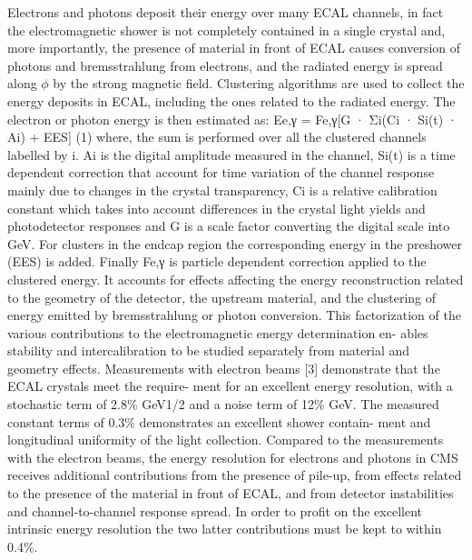 \documentclass[journal]{IEEEtran}
\begin{document}
Electrons and photons deposit their energy over many ECAL channels, in fact the electromagnetic shower is not completely contained in a single crystal and, more importantly, the presence of material in front of ECAL causes conversion of photons and bremsstrahlung from electrons, and the radiated energy is spread along $\phi$ by the strong magnetic field. Clustering algorithms are used to collect the energy deposits in ECAL, including the ones related to the radiated energy.
The electron or photon energy is then estimated as:
Ee,γ = Fe,γ[G · Σi(Ci · Si(t) · Ai) + EES] (1)
where, the sum is performed over all the clustered channels labelled by i. Ai is the digital amplitude measured in the channel, Si(t) is a time dependent correction that account for time variation of the channel response mainly due to changes in the crystal transparency, Ci is a relative calibration constant which takes into account differences in the crystal light yields and photodetector responses and G is a scale factor converting the digital scale into GeV. For clusters in the endcap region the corresponding energy in the preshower (EES) is added. Finally Fe,γ is particle dependent correction applied to the clustered energy. It accounts for effects affecting the energy reconstruction related to the geometry of the detector, the upstream material, and the clustering of energy emitted by bremsstrahlung or photon conversion.
This factorization of the various contributions to the electromagnetic energy determination en- ables stability and intercalibration to be studied separately from material and geometry effects.
Measurements with electron beams [3] demonstrate that the ECAL crystals meet the require- ment for an excellent energy resolution, with a stochastic term of 2.8\% GeV1/2 and a noise term of 12\% GeV. The measured constant terms of 0.3\% demonstrates an excellent shower contain- ment and longitudinal uniformity of the light collection. Compared to the measurements with the electron beams, the energy resolution for electrons and photons in CMS receives additional contributions from the presence of pile-up, from effects related to the presence of the material in front of ECAL, and from detector instabilities and channel-to-channel response spread. In order to profit on the excellent intrinsic energy resolution the two latter contributions must be kept to within 0.4\%.
\end{document}
